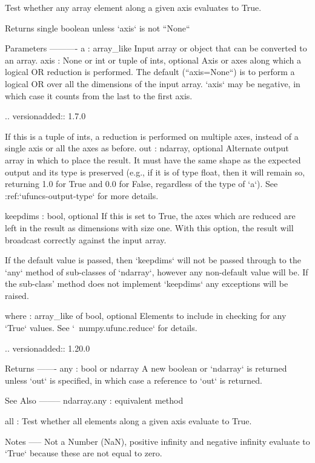 \begin{DoxyVerb}Test whether any array element along a given axis evaluates to True.

Returns single boolean unless `axis` is not ``None``

Parameters
----------
a : array_like
    Input array or object that can be converted to an array.
axis : None or int or tuple of ints, optional
    Axis or axes along which a logical OR reduction is performed.
    The default (``axis=None``) is to perform a logical OR over all
    the dimensions of the input array. `axis` may be negative, in
    which case it counts from the last to the first axis.

    .. versionadded:: 1.7.0

    If this is a tuple of ints, a reduction is performed on multiple
    axes, instead of a single axis or all the axes as before.
out : ndarray, optional
    Alternate output array in which to place the result.  It must have
    the same shape as the expected output and its type is preserved
    (e.g., if it is of type float, then it will remain so, returning
    1.0 for True and 0.0 for False, regardless of the type of `a`).
    See :ref:`ufuncs-output-type` for more details.

keepdims : bool, optional
    If this is set to True, the axes which are reduced are left
    in the result as dimensions with size one. With this option,
    the result will broadcast correctly against the input array.

    If the default value is passed, then `keepdims` will not be
    passed through to the `any` method of sub-classes of
    `ndarray`, however any non-default value will be.  If the
    sub-class' method does not implement `keepdims` any
    exceptions will be raised.

where : array_like of bool, optional
    Elements to include in checking for any `True` values.
    See `~numpy.ufunc.reduce` for details.

    .. versionadded:: 1.20.0

Returns
-------
any : bool or ndarray
    A new boolean or `ndarray` is returned unless `out` is specified,
    in which case a reference to `out` is returned.

See Also
--------
ndarray.any : equivalent method

all : Test whether all elements along a given axis evaluate to True.

Notes
-----
Not a Number (NaN), positive infinity and negative infinity evaluate
to `True` because these are not equal to zero.


\end{DoxyVerb}
